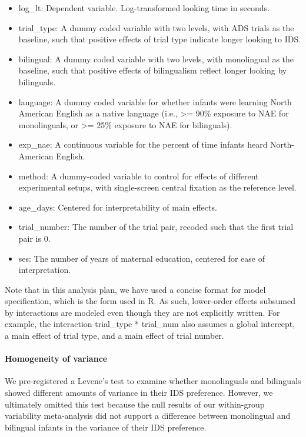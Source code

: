 \documentclass[,man,floatsintext]{apa6}
\providecommand{\tightlist}{%
  \setlength{\itemsep}{0pt}\setlength{\parskip}{0pt}}
\let\oldparagraph\paragraph
\renewcommand{\paragraph}[1]{\oldparagraph{#1}\mbox{}}
\begin{document}
\begin{itemize}
\tightlist
\item
  log\_lt: Dependent variable. Log-transformed looking time in seconds.
\item
  trial\_type: A dummy coded variable with two levels, with ADS trials as the baseline, such that positive effects of trial type indicate longer looking to IDS.
\item
  bilingual: A dummy coded variable with two levels, with monolingual as the baseline, such that positive effects of bilingualism reflect longer looking by bilinguals.
\item
  language: A dummy coded variable for whether infants were learning North American English as a native language (i.e., \textgreater{}= 90\% exposure to NAE for monolinguals, or \textgreater{}= 25\% exposure to NAE for bilinguals).
\item
  exp\_nae: A continuous variable for the percent of time infants heard North-American English.
\item
  method: A dummy-coded variable to control for effects of different experimental setups, with single-screen central fixation as the reference level.
\item
  age\_days: Centered for interpretability of main effects.
\item
  trial\_number: The number of the trial pair, recoded such that the first trial pair is 0.
\item
  ses: The number of years of maternal education, centered for ease of interpretation.
\end{itemize}

Note that in this analysis plan, we have used a concise format for model specification, which is the form used in R. As such, lower-order effects subsumed by interactions are modeled even though they are not explicitly written. For example, the interaction trial\_type * trial\_num also assumes a global intercept, a main effect of trial type, and a main effect of trial number.

\hypertarget{homogeneity-of-variance}{%
\paragraph{Homogeneity of variance}\label{homogeneity-of-variance}}

We pre-registered a Levene's test to examine whether monolinguals and bilinguals showed different amounts of variance in their IDS preference. However, we ultimately omitted this test because the null results of our within-group variability meta-analysis did not support a difference between monolingual and bilingual infants in the variance of their IDS preference.
\end{document}
